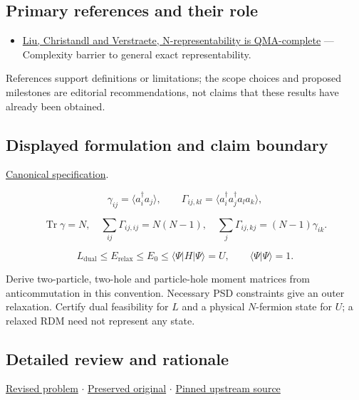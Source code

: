 \documentclass[
  11pt,
]{article}
\providecommand{\tightlist}{%
  \setlength{\itemsep}{0pt}\setlength{\parskip}{0pt}}
\begin{document}
\subsection{Primary references and their role}

\begin{itemize}
\tightlist
\item
  \href{https://arxiv.org/abs/quant-ph/0609125}{Liu, Christandl and
  Verstraete, N-representability is QMA-complete} --- Complexity barrier
  to general exact representability.
\end{itemize}

References support definitions or limitations; the scope choices and
proposed milestones are editorial recommendations, not claims that these
results have already been obtained.

\subsection{Displayed formulation and claim boundary}

\href{https://github.com/rick-stevens-ai/Pure-Thought/blob/main/PRDs/16-N-Representability-2RDM.md}{Canonical
specification}.

\[\gamma_{ij}=\langle a_i^\dagger a_j\rangle,\qquad
\Gamma_{ij,kl}=\langle a_i^\dagger a_j^\dagger a_l a_k\rangle,\]

\[\operatorname{Tr}\gamma=N,\quad
\sum_{ij}\Gamma_{ij,ij}=N(N-1),\quad
\sum_j\Gamma_{ij,kj}=(N-1)\gamma_{ik}.\]

\[L_{\mathrm{dual}}\le E_{\mathrm{relax}}\le E_0\le
\langle\Psi|H|\Psi\rangle=U,\qquad \langle\Psi|\Psi\rangle=1.\]

Derive two-particle, two-hole and particle-hole moment matrices from
anticommutation in this convention. Necessary PSD constraints give an
outer relaxation. Certify dual feasibility for \(L\) and a physical
\(N\)-fermion state for \(U\); a relaxed RDM need not represent any
state.

\subsection{Detailed review and rationale}

\href{https://github.com/rick-stevens-ai/Pure-Thought/blob/main/PRDs/16-N-Representability-2RDM.md}{Revised
problem} \ensuremath{\cdot}
\href{https://github.com/rick-stevens-ai/Pure-Thought/blob/main/archive/original-PRDs/16-N-Representability-2RDM.md}{Preserved
original} \ensuremath{\cdot}
\href{https://github.com/rick-stevens-ai/Pure-Thought/blob/f854d4e12b55c1f5b5c2a964b75f2d23496d981e/PRDs/16-N-Representability-2RDM.md}{Pinned
upstream source}
\end{document}
